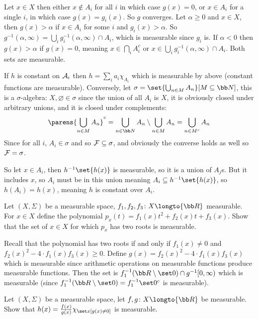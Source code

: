 \benum
    \item Let $x\in X$ then either $x\notin A_i$ for all $i$ in which case $g(x)=0$, or $x\in A_i$ for a single $i$, in which case $g(x)=g_i(x)$.
    So $g$ converges.
    Let $\alpha\geq0$ and $x\in X$, then $g(x)>\alpha$ if $x\in A_i$ for some $i$ and $g_i(x)>\alpha$.
    So $g^{-1}(\alpha,\infty)=\bigcup_ig_i^{-1}(\alpha,\infty)\cap A_i$, which is measurable since $g_i$ is.
    If $\alpha<0$ then $g(x)>\alpha$ if $g(x)=0$, meaning $x\in\bigcap_iA_i^c$ or $x\in\bigcup_ig_i^{-1}(\alpha,\infty)\cap A_i$.
    Both sets are measurable.
    \item If $h$ is constant on ${\cal A}_i$ then $h=\sum_ia_i\chi_{A_i}$ which is measurable by above (constant functions are measurable).
    Conversely, let $\sigma=\set{\bigcup_{n\in M}A_n}[M\subseteq{\bb N}]$, this is a $\sigma$-algebra: $X,\varnothing\in\sigma$ since the union of all $A_i$ is $X$, it is obviously closed under
    arbitrary unions, and it is closed under complements:
    $$ \parens{\bigcup_{n\in M}A_n}^c = \bigcup_{n\in{\bb N}}A_n\setminus\bigcup_{n\in M}A_n = \bigcup_{n\in M^c}A_n $$
    Since for all $i$, $A_i\in\sigma$ and so ${\cal F}\subseteq\sigma$, and obviously the converse holds as well so ${\cal F}=\sigma$.

    So let $x\in A_i$, then $h^{-1}\set{h(x)}$ is measurable, so it is a union of $A_j$s.
    But it includes $x$, so $A_i$ must be in this union meaning $A_i\subseteq h^{-1}\set{h(x)}$, so $h(A_i)=h(x)$, meaning $h$ is constant over $A_i$.
\eenum

\bexerc

    Let $(X,\Sigma)$ be a measurable space, $f_1,f_2,f_3\colon X\longto{\bb R}$ measurable.
    For $x\in X$ define the polynomial $p_x(t)=f_1(x)t^2+f_2(x)t+f_3(x)$.
    Show that the set of $x\in X$ for which $p_x$ has two roots is measurable.

\eexerc

Recall that the polynomial has two roots if and only if $f_1(x)\neq0$ and $f_2(x)^2-4\cdot f_1(x)f_3(x)\geq0$.
Define $g(x)=f_2(x)^2-4\cdot f_1(x)f_3(x)$ which is measurable since arithmetic operations on measurable functions produce measurable functions.
Then the set is $f_1^{-1}({\bb R}\setminus\set0)\cap g^{-1}[0,\infty)$ which is measurable (since $f_1^{-1}({\bb R}\setminus\set0)=f_1^{-1}\set0^c$ is measurable).

\bexerc

    Let $(X,\Sigma)$ be a measurable space, let $f,g\colon X\longto{\bb R}$ be measurable.
    Show that $h(x)=\frac{f(x)}{g(x)}\chi_{\set x[g(x)\neq0]}$ is measurable.

